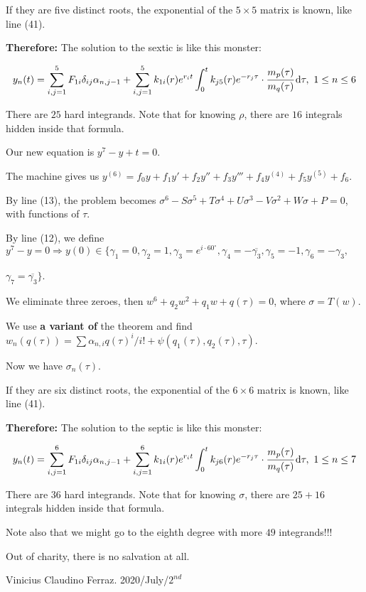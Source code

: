 \documentclass[12pt]{article}
\begin{document}
If they are five distinct roots, the exponential of the $5 \times 5$ matrix is known, like line (41).

\Large

\textbf{Therefore:} The solution to the sextic is like this monster:

\begin{align}
y_n(t) = \sum_{i,j=1}^5 F_{1i} \delta_{ij} \alpha_{n,j-1} + \sum_{i,j=1}^5 k_{1i}(r) e^{r_i t} \int_0^t k_{j5}(r) e^{-r_j\tau} \cdot \cfrac{m_p(\tau)}{m_q(\tau)}\,\mathrm{d}\tau,\,\,1\le n \le 6 \nonumber
\end{align}

\normalsize

There are $25$ hard integrands. Note that for knowing $\rho$, there are $16$ integrals hidden inside that formula.

\vspace{6mm}

Our new equation is $y^7 - y + t = 0$. 

The machine gives us $y^{(6)} = f_0 y + f_1 y' + f_2 y'' + f_3 y''' + f_4 y^{(4)} + f_5 y^{(5)} + f_6$.

By line (13), the problem becomes $\sigma^6 - S\sigma^5 + T\sigma^4 + U\sigma^3 - V\sigma^2 + W\sigma + P = 0$, with functions of $\tau$.

By line (12), we define $y^7 - y = 0 \Rightarrow y(0) \in \{\gamma_1 = 0, \gamma_2 = 1, \gamma_3 = e^{i\cdot 60^\circ}, \gamma_4 = -\overline{\gamma_3}, \gamma_5 = -1, \gamma_6 = -\gamma_3,$

$\gamma_7 = \overline{\gamma_3} \}$. 

We eliminate three zeroes, then $w^6 + q_2 w^2 + q_1 w + q(\tau) = 0$, where $\sigma = T(w)$.

We use \textbf{a variant of} the theorem and find $w_n(q(\tau)) = \sum \alpha_{n,i} q(\tau)^i/i! + \psi(q_1(\tau), q_2(\tau), \tau)$. 

Now we have $\sigma_n(\tau)$.

If they are six distinct roots, the exponential of the $6 \times 6$ matrix is known, like line (41).

\Large

\textbf{Therefore:} The solution to the septic is like this monster:

\begin{align}
y_n(t) = \sum_{i,j=1}^6 F_{1i} \delta_{ij} \alpha_{n,j-1} + \sum_{i,j=1}^6 k_{1i}(r) e^{r_i t} \int_0^t k_{j6}(r) e^{-r_j\tau} \cdot \cfrac{m_p(\tau)}{m_q(\tau)}\,\mathrm{d}\tau,\,\,1\le n \le 7 \nonumber
\end{align}

\normalsize

There are $36$ hard integrands. Note that for knowing $\sigma$, there are $25 + 16$ integrals hidden inside that formula.

\vspace{3mm}

Note also that we might go to the eighth degree with more $49$ integrands!!!

\vspace{6mm}

Out of charity, there is no salvation at all.

Vinicius Claudino Ferraz. 2020/July/$2^{nd}$
\end{document}
